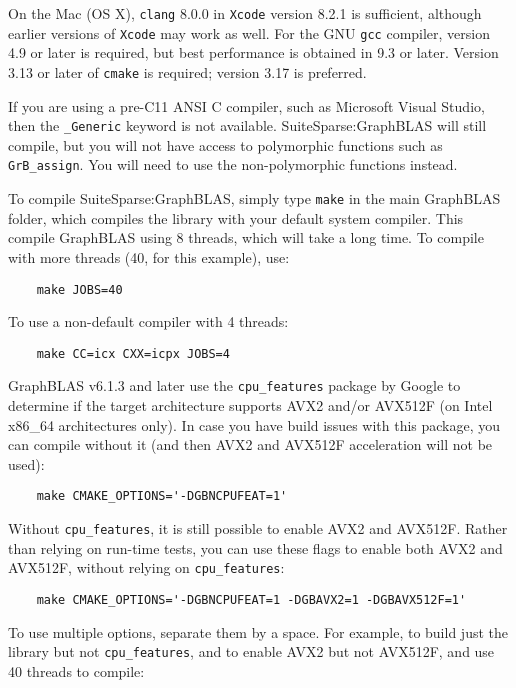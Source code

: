 \documentclass[12pt]{article}
\begin{document}
On the Mac (OS X), \verb'clang' 8.0.0 in \verb'Xcode' version 8.2.1 is
sufficient, although earlier versions of \verb'Xcode' may work as well.  For
the GNU \verb'gcc' compiler, version 4.9 or later is required, but best
performance is obtained in 9.3 or later.  Version 3.13 or later of \verb'cmake'
is required; version 3.17 is preferred.

If you are using a pre-C11 ANSI C compiler, such as Microsoft Visual Studio,
then the \verb'_Generic' keyword is not available.  SuiteSparse:GraphBLAS
will still compile, but you will not have access to polymorphic functions
such as \verb'GrB_assign'.  You will need to use the non-polymorphic functions
instead.

To compile SuiteSparse:GraphBLAS, simply type \verb'make' in the main GraphBLAS
folder, which compiles the library with your default system compiler.  This
compile GraphBLAS using 8 threads, which will take a long time.  To compile with
more threads (40, for this example), use:

    {\small
    \begin{verbatim}
    make JOBS=40 \end{verbatim} }

To use a non-default compiler with 4 threads:

    {\small
    \begin{verbatim}
    make CC=icx CXX=icpx JOBS=4 \end{verbatim} }

GraphBLAS v6.1.3 and later use the \verb'cpu_features' package by Google to
determine if the target architecture supports AVX2 and/or AVX512F (on Intel
x86\_64 architectures only).  In case you have build issues with this package,
you can compile without it (and then AVX2 and AVX512F acceleration will not
be used):

    {\small
    \begin{verbatim}
    make CMAKE_OPTIONS='-DGBNCPUFEAT=1'  \end{verbatim} }

Without \verb'cpu_features', it is still possible to enable AVX2 and AVX512F.
Rather than relying on run-time tests, you can use these flags to enable
both AVX2 and AVX512F, without relying on \verb'cpu_features':

    {\small
    \begin{verbatim}
    make CMAKE_OPTIONS='-DGBNCPUFEAT=1 -DGBAVX2=1 -DGBAVX512F=1' \end{verbatim} }

To use multiple options, separate them by a space.  For example, to build
just the library but not \verb'cpu_features', and to enable
AVX2 but not AVX512F, and use 40 threads to compile:
\end{document}

